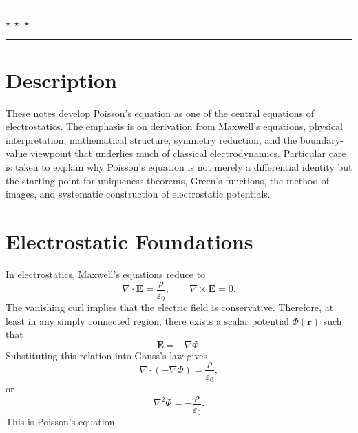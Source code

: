 \documentclass[12pt]{article}
\title{}
\author{}
\date{}
\begin{document}
\\
\\
\\[0.4cm]

\\
\\

\vspace{0.3cm}

\begin{center}
    \rule{0.25\textwidth}{0.4pt}\hspace{0.4em}$\star\ \star\ \star$\hspace{0.4em}\rule{0.25\textwidth}{0.4pt}
\end{center}

\vspace{0.5cm}

\section*{Description}
These notes develop Poisson's equation as one of the central equations of electrostatics. The emphasis is on derivation from Maxwell's equations, physical interpretation, mathematical structure, symmetry reduction, and the boundary-value viewpoint that underlies much of classical electrodynamics. Particular care is taken to explain why Poisson's equation is not merely a differential identity but the starting point for uniqueness theorems, Green's functions, the method of images, and systematic construction of electrostatic potentials.

\section{Electrostatic Foundations}
In electrostatics, Maxwell's equations reduce to
\[
\nabla\cdot \mathbf E=\frac{\rho}{\varepsilon_0},
\qquad
\nabla\times \mathbf E=0.
\]
The vanishing curl implies that the electric field is conservative. Therefore, at least in any simply connected region, there exists a scalar potential $\Phi(\mathbf r)$ such that
\[
\mathbf E=-\nabla \Phi.
\]
Substituting this relation into Gauss's law gives
\[
\nabla\cdot(-\nabla \Phi)=\frac{\rho}{\varepsilon_0},
\]
or
\[
\boxed{\nabla^2\Phi=-\frac{\rho}{\varepsilon_0}}.
\]
This is Poisson's equation.
\end{document}
